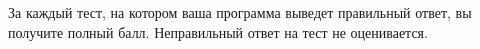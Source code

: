 За каждый тест, на котором ваша программа выведет правильный ответ, вы
получите полный балл. Неправильный ответ на тест не оценивается. 
